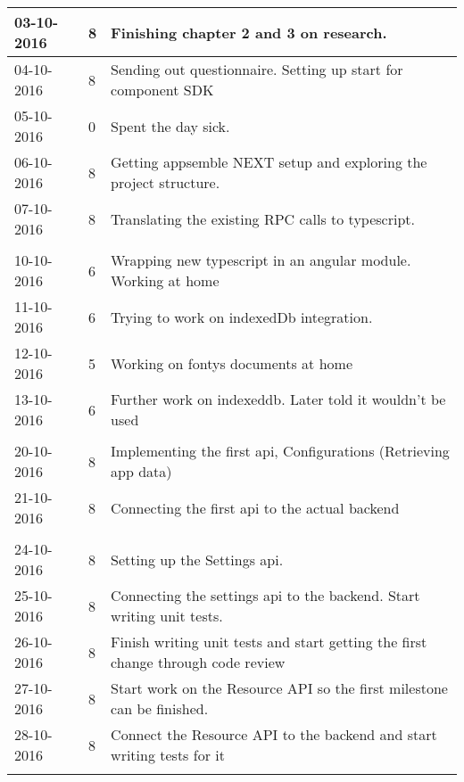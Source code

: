 \begin{tabular}{|p{2cm}|p{1cm}|p{10cm}|}
	\hline
	03-10-2016 & 8 & Finishing chapter 2 and 3 on research. \\ \hline
	04-10-2016 & 8 & Sending out questionnaire. Setting up start for component SDK \\ \hline
	05-10-2016 & 0 & Spent the day sick. \\ \hline
	06-10-2016 & 8 & Getting appsemble NEXT setup and exploring the project structure. \\ \hline
	07-10-2016 & 8 & Translating the existing RPC calls to typescript. \\ \hline
	
	\\ \hline
	
	10-10-2016 & 6 & Wrapping new typescript in an angular module. Working at home \\ \hline
	11-10-2016 & 6 & Trying to work on indexedDb integration. \\ \hline
	12-10-2016 & 5 & Working on fontys documents at home \\ \hline
	13-10-2016 & 6 & Further work on indexeddb. Later told it wouldn't be used \\ \hline
	
	\\ \hline
	
	20-10-2016 & 8 & Implementing the first api, Configurations (Retrieving app data) \\ \hline
	21-10-2016 & 8 & Connecting the first api to the actual backend \\ \hline
	
	\\ \hline
	
	24-10-2016 & 8 & Setting up the Settings api. \\ \hline
	25-10-2016 & 8 & Connecting the settings api to the backend. Start writing unit tests. \\ \hline
	26-10-2016 & 8 & Finish writing unit tests and start getting the first change through code review \\ \hline
	27-10-2016 & 8 & Start work on the Resource API so the first milestone can be finished. \\ \hline
	28-10-2016 & 8 & Connect the Resource API to the backend and start writing tests for it \\ \hline
	
	\\ \hline
	

\end{tabular}
